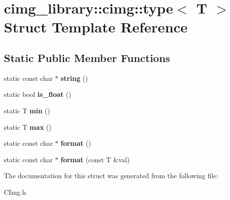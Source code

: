 \hypertarget{structcimg__library_1_1cimg_1_1type}{\section{cimg\-\_\-library\-:\-:cimg\-:\-:type$<$ T $>$ Struct Template Reference}
\label{structcimg__library_1_1cimg_1_1type}
}
\subsection*{Static Public Member Functions}
\begin{DoxyCompactItemize}
\item 
\hypertarget{structcimg__library_1_1cimg_1_1type_a38996852de8c2072c9e26a2915f0831d}{static const char $\ast$ {\bfseries string} ()}\label{structcimg__library_1_1cimg_1_1type_a38996852de8c2072c9e26a2915f0831d}

\item 
\hypertarget{structcimg__library_1_1cimg_1_1type_ac60cdaeac5043ff78a003863238a11e0}{static bool {\bfseries is\-\_\-float} ()}\label{structcimg__library_1_1cimg_1_1type_ac60cdaeac5043ff78a003863238a11e0}

\item 
\hypertarget{structcimg__library_1_1cimg_1_1type_ac4283ac279ac80e436e9ec4d03d6a7b3}{static T {\bfseries min} ()}\label{structcimg__library_1_1cimg_1_1type_ac4283ac279ac80e436e9ec4d03d6a7b3}

\item 
\hypertarget{structcimg__library_1_1cimg_1_1type_a7112048ca6edb4576610cab754b29e29}{static T {\bfseries max} ()}\label{structcimg__library_1_1cimg_1_1type_a7112048ca6edb4576610cab754b29e29}

\item 
\hypertarget{structcimg__library_1_1cimg_1_1type_aeaf21973aabddae7807b26edfbc804ec}{static const char $\ast$ {\bfseries format} ()}\label{structcimg__library_1_1cimg_1_1type_aeaf21973aabddae7807b26edfbc804ec}

\item 
\hypertarget{structcimg__library_1_1cimg_1_1type_aad008581d85a15b5ec178f6b1f6aa7da}{static const char $\ast$ {\bfseries format} (const T \&val)}\label{structcimg__library_1_1cimg_1_1type_aad008581d85a15b5ec178f6b1f6aa7da}

\end{DoxyCompactItemize}


The documentation for this struct was generated from the following file\-:\begin{DoxyCompactItemize}
\item 
C\-Img.\-h\end{DoxyCompactItemize}
